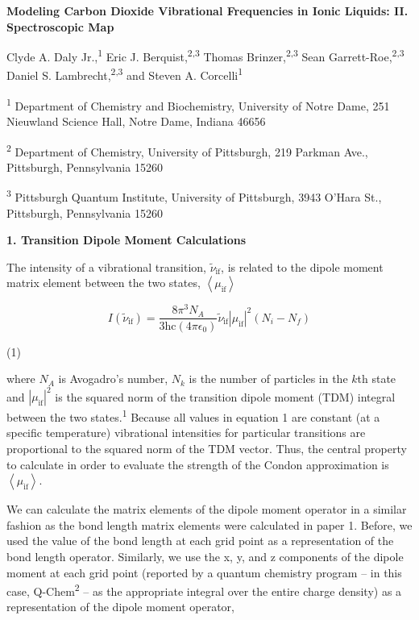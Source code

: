 \documentclass[]{article}
\date{}
\begin{document}
\textbf{Modeling Carbon Dioxide Vibrational Frequencies in Ionic
Liquids: II. Spectroscopic Map}

Clyde A. Daly Jr.,\textsuperscript{1} Eric J.
Berquist,\textsuperscript{2,3} Thomas Brinzer,\textsuperscript{2,3} Sean
Garrett-Roe,\textsuperscript{2,3} Daniel S.
Lambrecht,\textsuperscript{2,3} and Steven A.
Corcelli\textsuperscript{1}

\textsuperscript{1} Department of Chemistry and Biochemistry, University
of Notre Dame, 251 Nieuwland Science Hall, Notre Dame, Indiana 46656

\textsuperscript{2} Department of Chemistry, University of Pittsburgh,
219 Parkman Ave., Pittsburgh, Pennsylvania 15260

\textsuperscript{3} Pittsburgh Quantum Institute, University of
Pittsburgh, 3943 O'Hara St., Pittsburgh, Pennsylvania 15260

\textbf{1. Transition Dipole Moment Calculations}

The intensity of a vibrational transition,
\({\widetilde{\nu}}_{\text{if}}\), is related to the dipole moment
matrix element between the two states,
\(\left\langle {\overset{}{\mu}}_{\text{if}} \right\rangle\)

\[I\left( {\widetilde{\nu}}_{\text{if}} \right) = \frac{8\pi^{3}N_{A}}{3\text{hc}\left( 4\pi\epsilon_{0} \right)}{\widetilde{\nu}}_{\text{if}}\left| {\overset{}{\mu}}_{\text{if}} \right|^{2}(N_{i} - N_{f})\]

(1)

where \(N_{A}\) is Avogadro's number, \(N_{k}\) is the number of
particles in the \(k\)th state and
\(\left| {\overset{}{\mu}}_{\text{if}} \right|^{2}\) is the squared norm
of the transition dipole moment (TDM) integral between the two
states.\textsuperscript{1} Because all values in equation 1 are constant
(at a specific temperature) vibrational intensities for particular
transitions are proportional to the squared norm of the TDM vector.
Thus, the central property to calculate in order to evaluate the
strength of the Condon approximation is
\(\left\langle {\overset{}{\mu}}_{\text{if}} \right\rangle\).

We can calculate the matrix elements of the dipole moment operator in a
similar fashion as the bond length matrix elements were calculated in
paper 1. Before, we used the value of the bond length at each grid point
as a representation of the bond length operator. Similarly, we use the
x, y, and z components of the dipole moment at each grid point (reported
by a quantum chemistry program -- in this case,
Q-Chem\textsuperscript{2} -- as the appropriate integral over the entire
charge density) as a representation of the dipole moment operator,
\end{document}
